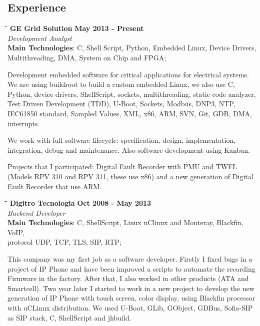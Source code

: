 \documentclass[margin]{res}
\begin{document}
\begin{resume}
\section{Experience}
\vspace{-0.1in}
    \begin{tabbing}
    \hspace{2.3in}\= \hspace{1.7in}\= \kill %
    \textbf{GE Grid Solution}    \>\>\textbf{May 2013 - Present}\\
    \textit{Development Analyst}\\
    \textbf{Main Technologies}: C, Shell Script, Python, Embedded Linux, Device Drivers,\\
                                Multithreading, DMA, System on Chip and FPGA;
    \end{tabbing}\vspace{-20pt}      %
    \vspace{2mm}
Development embedded software for critical applications for electrical systems. We are using buildroot to build a custom embedded Linux, we also use C, Python, device drivers, ShellScript, sockets, multithreading, static code analyzer, Test Driven Development (TDD), U-Boot, Sockets, Modbus, DNP3, NTP, IEC61850 standard, Sampled Values, XML, x86, ARM, SVN, Git, GDB, DMA, interrupts.

We work with full software lifecycle: specification, design, implementation, integration, debug and maintenance. Also software development using Kanban.

Projects that I participated: Digital Fault Recorder with PMU and TWFL (Models RPV 310 and RPV 311, these use x86) and a new generation of Digital Fault Recorder that use ARM.

\vspace{-0.1in}
    \begin{tabbing}
    \hspace{2.3in}\= \hspace{1.7in}\= \kill
    \textbf{Digitro Tecnologia}    \>\>\textbf{Oct 2008 - May 2013}\\
    \textit{Backend Developer}\\
    \textbf{Main Technologies}: C, ShellScript, Linux uClinux and Monteray, Blackfin, VoIP,\\ protocol UDP, TCP, TLS, SIP, RTP;
    \end{tabbing}\vspace{-20pt}
    \vspace{2mm}
This company was my first job as a software developer. Firstly I fixed bugs in a project of IP Phone and have been improved a scripts to automate the recording Firmware in the factory. After that, I also worked in other products (ATA and Smartcell). Two year later I started to work in a new project to develop the new generation of IP Phone with touch screen, color display, using Blackfin processor with uCLinux distribution. We used U-Boot, GLib, GObject, GDBus, Sofia-SIP as SIP stack, C, ShellScript and jhbuild.


\end{resume}
\end{document}
